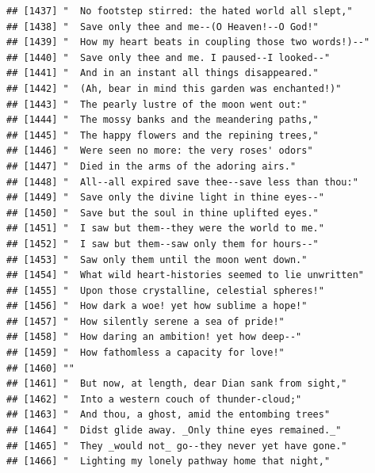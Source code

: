 \documentclass{article}\usepackage[]{graphicx}\usepackage[]{color}
\makeatletter
\newenvironment{kframe}{%
 \def\at@end@of@kframe{}%
 \ifinner\ifhmode%
  \def\at@end@of@kframe{\end{minipage}}%
  \begin{minipage}{\columnwidth}%
 \fi\fi%
 \def\FrameCommand##1{\hskip\@totalleftmargin \hskip-\fboxsep
 \colorbox{shadecolor}{##1}\hskip-\fboxsep
     \hskip-\linewidth \hskip-\@totalleftmargin \hskip\columnwidth}%
 \MakeFramed {\advance\hsize-\width
   \@totalleftmargin\z@ \linewidth\hsize
   \@setminipage}}%
 {\par\unskip\endMakeFramed%
 \at@end@of@kframe}
\newenvironment{knitrout}{}{} %
\makeatother
\begin{document}
\begin{knitrout}
\begin{kframe}
\begin{verbatim}
## [1437] "  No footstep stirred: the hated world all slept,"                           
## [1438] "  Save only thee and me--(O Heaven!--O God!"                                 
## [1439] "  How my heart beats in coupling those two words!)--"                        
## [1440] "  Save only thee and me. I paused--I looked--"                               
## [1441] "  And in an instant all things disappeared."                                 
## [1442] "  (Ah, bear in mind this garden was enchanted!)"                             
## [1443] "  The pearly lustre of the moon went out:"                                   
## [1444] "  The mossy banks and the meandering paths,"                                 
## [1445] "  The happy flowers and the repining trees,"                                 
## [1446] "  Were seen no more: the very roses' odors"                                  
## [1447] "  Died in the arms of the adoring airs."                                     
## [1448] "  All--all expired save thee--save less than thou:"                          
## [1449] "  Save only the divine light in thine eyes--"                                
## [1450] "  Save but the soul in thine uplifted eyes."                                 
## [1451] "  I saw but them--they were the world to me."                                
## [1452] "  I saw but them--saw only them for hours--"                                 
## [1453] "  Saw only them until the moon went down."                                   
## [1454] "  What wild heart-histories seemed to lie unwritten"                         
## [1455] "  Upon those crystalline, celestial spheres!"                                
## [1456] "  How dark a woe! yet how sublime a hope!"                                   
## [1457] "  How silently serene a sea of pride!"                                       
## [1458] "  How daring an ambition! yet how deep--"                                    
## [1459] "  How fathomless a capacity for love!"                                       
## [1460] ""                                                                            
## [1461] "  But now, at length, dear Dian sank from sight,"                            
## [1462] "  Into a western couch of thunder-cloud;"                                    
## [1463] "  And thou, a ghost, amid the entombing trees"                               
## [1464] "  Didst glide away. _Only thine eyes remained._"                             
## [1465] "  They _would not_ go--they never yet have gone."                            
## [1466] "  Lighting my lonely pathway home that night,"                               

\end{verbatim}
\end{kframe}
\end{knitrout}
\end{document}
